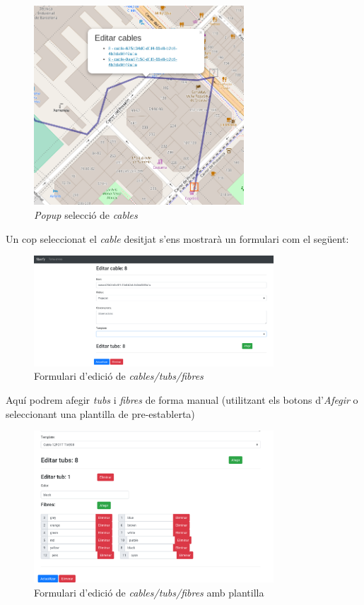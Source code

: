 \documentclass[a4paper]{article}
\begin{document}
	\begin{figure}[H]
		\centering
		\includegraphics[width=0.7\textwidth]{images/cable_edit_popup.png}
		\caption{\emph{Popup} selecció de \emph{cables}}
	\end{figure}
	
	Un cop seleccionat el \emph{cable} desitjat s'ens mostrarà un formulari com el següent:
	\begin{figure}[H]
		\centering
		\includegraphics[width=0.8\textwidth]{images/cable_edit_form.png}
		\caption{Formulari d'edició de \emph{cables/tubs/fibres}}
	\end{figure}

	Aquí podrem afegir \emph{tubs} i \emph{fibres} de forma manual (utilitzant els botons d'\emph{Afegir} o seleccionant una plantilla de pre-establerta)
	
	\begin{figure}[H]
		\centering
		\includegraphics[width=0.8\textwidth]{images/cable_edit_form_template.png}
		\caption{Formulari d'edició de \emph{cables/tubs/fibres} amb plantilla}
	\end{figure}
	
\end{document}
